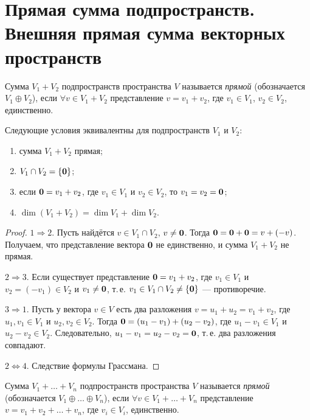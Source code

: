 \section{Прямая сумма подпространств. Внешняя прямая сумма векторных пространств}

\begin{definition}
    Сумма $V_1 + V_2$ подпространств пространства $V$ называется \textit{прямой} (обозначается $V_1 \oplus V_2$), если $\forall v \in V_1 + V_2$ представление $v = v_1 + v_2$, где $v_1 \in V_1$, $v_2 \in V_2$, единственно.
\end{definition}

\begin{theorem}
    Следующие условия эквивалентны для подпространств $V_1$ и $V_2$:
    \begin{enumerate}[nolistsep]
        \item сумма $V_1 + V_2$ прямая;
        \item $V_1 \cap V_2 = \{\boldsymbol{0}\}$;
        \item если $\boldsymbol{0} = v_1 + v_2$, где $v_1 \in V_1$ и $v_2 \in V_2$, то $v_1 = v_2 = \boldsymbol{0}$;
        \item $\dim(V_1 + V_2) = \dim V_1 + \dim V_2$.
    \end{enumerate}
\end{theorem}

\begin{proof}
    $1 \Rightarrow 2$. Пусть найдётся $v \in V_1 \cap V_2$, $v \ne \boldsymbol{0}$. Тогда $\boldsymbol{0} = \boldsymbol{0} + \boldsymbol{0} = v + (-v)$. Получаем, что представление вектора $\boldsymbol{0}$ не единственно, и сумма $V_1 + V_2$ не прямая.

    $2 \Rightarrow 3$. Если существует представление $\boldsymbol{0} = v_1 + v_2$, где $v_1 \in V_1$ и $v_2 = (-v_1) \in V_2$ и $v_1 \ne \boldsymbol{0}$, т.\,е. $v_1 \in V_1 \cap V_2 \ne \{\boldsymbol{0}\}$ --- противоречие.

    $3 \Rightarrow 1$. Пусть у вектора $v \in V$ есть два разложения $v = u_1 + u_2 = v_1 + v_2$, где $u_1, v_1 \in V_1$ и $u_2, v_2 \in V_2$. Тогда $\boldsymbol{0} = (u_1 - v_1) + (u_2 - v_2)$, где $u_1 - v_1 \in V_1$ и $u_2 - v_2 \in V_2$. Следовательно, $u_1 - v_1 = u_2 - v_2 = \boldsymbol{0}$, т.\,е. два разложения совпадают.

    $2 \Leftrightarrow 4$. Следствие формулы Грассмана.
\end{proof}

\begin{definition}
    Сумма $V_1 + \ldots + V_n$ подпространств пространства $V$ называется \textit{прямой} (обозначается $V_1 \oplus \ldots \oplus V_n$), если $\forall v \in V_1 + \ldots + V_n$ представление $v = v_1 + v_2 + \ldots + v_n$, где $v_i \in V_i$, единственно.
\end{definition}

